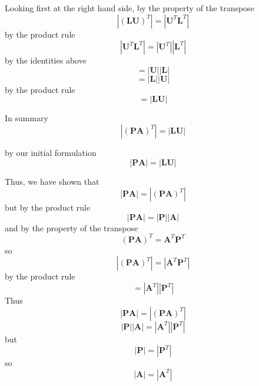 \documentclass[11pt, oneside]{article}
\begin{document}
Looking first at the right hand side, by the property of the transpose
\[ |(\mathbf{LU})^T| = |\mathbf{U}^T \mathbf{L}^T| \]
by the product rule
\[ |\mathbf{U}^T \mathbf{L}^T| =  |\mathbf{U}^T| |\mathbf{L}^T|\]
by the identities above
\[ = |\mathbf{U}| |\mathbf{L}|\]
\[ = |\mathbf{L}| |\mathbf{U}|\]
by the product rule
\[ = |\mathbf{LU}|\]

In summary
\[ |(\mathbf{PA})^T|= |\mathbf{LU}|\]

by our initial formulation
\[ |\mathbf{PA}| = |\mathbf{LU}| \]


Thus, we have shown that 
\[ |\mathbf{PA}| = |(\mathbf{PA})^T| \]
but by the product rule
\[ |\mathbf{PA}| = |\mathbf{P}| |\mathbf{A}| \]
and by the property of the transpose
\[ (\mathbf{PA})^T = \mathbf{A}^T \mathbf{P}^T \]
so
\[ |(\mathbf{PA})^T| = | \mathbf{A}^T \mathbf{P}^T  |\]
by the product rule 
\[ = | \mathbf{A}^T | | \mathbf{P}^T  |\]
Thus
\[ |\mathbf{PA}| = |(\mathbf{PA})^T| \]
\[ |\mathbf{P}| |\mathbf{A}| = | \mathbf{A}^T | | \mathbf{P}^T  |\]
but 
\[ |\mathbf{P}| = | \mathbf{P}^T  |\]
so
\[ |\mathbf{A}| = | \mathbf{A}^T  |\]
\end{document}
